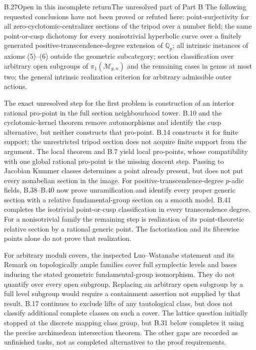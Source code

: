 \begin{statement}{B.27}{Open in this incomplete return}{The unresolved part of Part B}
The following requested conclusions have not been proved or
refuted here: point-surjectivity for all zero-cyclotomic-centralizer
sections of the tripod over a number field; the same point-or-cusp
dichotomy for every nonisotrivial hyperbolic curve over a finitely
generated positive-transcendence-degree extension of $\mathbb Q_p$;
all intrinsic instances of axioms
(5)--(6) outside the geometric subcategory; section classification
over arbitrary open subgroups of $\pi_1(\mathcal M_{g,n})$ and the
remaining cases in genus at most two; the general
intrinsic realization
criterion for arbitrary admissible outer actions.
\end{statement}
\noindent
The exact unresolved step for the first problem is construction
of an interior rational pro-point in the full section neighbourhood
tower.  B.10 and the cyclotomic-kernel theorem remove automorphisms
and identify the cusp alternative, but neither constructs that
pro-point.  B.14 constructs it for finite support; the unrestricted
tripod section does not acquire finite support from the argument.
The local theorem and B.7 yield local pro-points, whose compatibility
with one global rational pro-point is the missing descent step.
Passing to Jacobian Kummer classes determines a point already
present, but does not put every nonabelian section in the image.
For positive-transcendence-degree $p$-adic fields, B.38--B.40
now prove unramification and identify every proper generic
section with a relative fundamental-group section on a smooth
model. B.41 completes the isotrivial point-or-cusp classification
in every transcendence degree. For a nonisotrivial family the
remaining step is realization of its point-theoretic relative
section by a rational generic point. The factorization and
its fibrewise points alone do not prove that realization.

For arbitrary moduli covers, the inspected Luo--Watanabe statement
and its Remark on topologically ample families cover full symplectic
levels and bases inducing the stated geometric fundamental-group
isomorphism.  They do not quantify over every open subgroup.
Replacing an arbitrary open subgroup by a full level subgroup
would require a containment assertion not supplied by that result.
B.17 continues to exclude lifts of any tautological class, but
does not classify additional complete classes on such a cover.
The lattice question initially stopped at the discrete mapping
class group, but B.31 below completes it using the precise
archimedean intersection theorem.  The other gaps are recorded
as unfinished tasks, not as completed alternatives to the proof
requirements.


